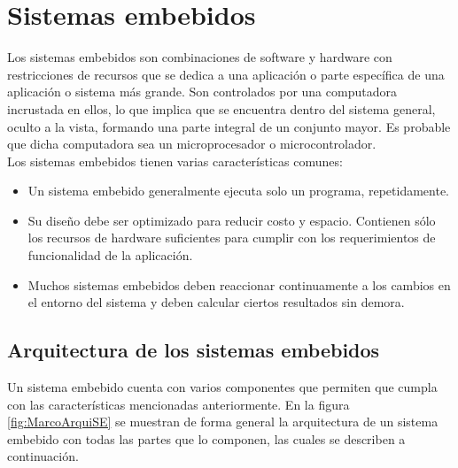 \section{Sistemas embebidos}
	Los sistemas embebidos son combinaciones de software y hardware con restricciones de recursos que se dedica a una aplicación o parte específica de una aplicación o sistema más grande. Son controlados por una computadora incrustada en ellos, lo que implica que se encuentra dentro del sistema general, oculto a la vista, formando una parte integral de un conjunto mayor. Es probable que dicha computadora sea un microprocesador o microcontrolador.\\
	
	Los sistemas embebidos tienen varias características comunes:
	\begin{itemize}
		\item Un sistema embebido generalmente ejecuta solo un programa, repetidamente.
		\item Su diseño debe ser optimizado para reducir costo y espacio. Contienen sólo los recursos de hardware suficientes para cumplir con  los  requerimientos  de  funcionalidad  de  la  aplicación.
		\item Muchos sistemas embebidos deben reaccionar continuamente a los cambios en el entorno del sistema y deben calcular ciertos resultados sin demora.
	\end{itemize}
	
	
	\subsection{Arquitectura de los sistemas embebidos}
	Un sistema embebido cuenta con varios componentes que permiten que cumpla con las características mencionadas anteriormente. En la figura \ref{fig:MarcoArquiSE} se muestran de forma general la arquitectura de un sistema embebido con todas las partes que lo componen, las cuales se describen a continuación.
	
